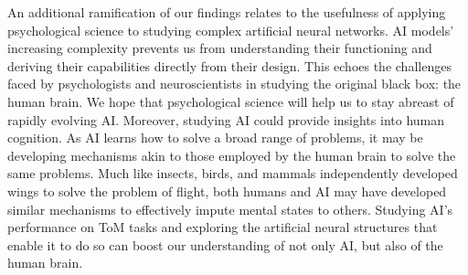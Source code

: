 \documentclass[11pt]{article}
\begin{document}
An additional ramification of our findings relates to the usefulness of applying psychological science to studying complex artificial neural networks. AI models’ increasing complexity prevents us from understanding their functioning and deriving their capabilities directly from their design. This echoes the challenges faced by psychologists and neuroscientists in studying the original black box: the human brain. We hope that psychological science will help us to stay abreast of rapidly evolving AI. Moreover, studying AI could provide insights into human cognition. As AI learns how to solve a broad range of problems, it may be developing mechanisms akin to those employed by the human brain to solve the same problems. Much like insects, birds, and mammals independently developed wings to solve the problem of flight, both humans and AI may have developed similar mechanisms to effectively impute mental states to others. Studying AI’s performance on ToM tasks and exploring the artificial neural structures that enable it to do so can boost our understanding of not only AI, but also of the human brain.
\end{document}
